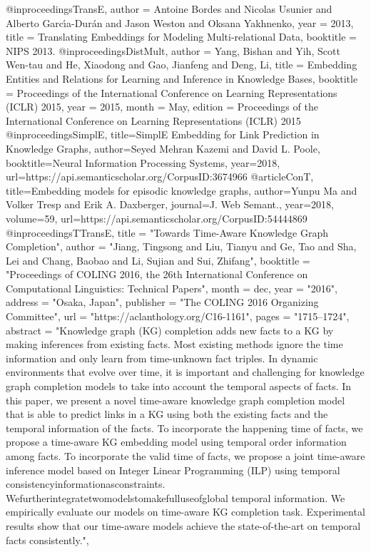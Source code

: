 @inproceedings{TransE,
  author    = {Antoine Bordes and
               Nicolas Usunier and
               Alberto Garc{\'{\i}}a{-}Dur{\'{a}}n and
               Jason Weston and
               Oksana Yakhnenko},
  year      = {2013},
  title     = {Translating Embeddings for Modeling Multi-relational Data},
  booktitle = {NIPS 2013.}
}
@inproceedings{DistMult,
  author    = {Yang, Bishan and Yih, Scott Wen-tau and He, Xiaodong and Gao, Jianfeng and Deng, Li},
  title     = {Embedding Entities and Relations for Learning and Inference in Knowledge Bases},
  booktitle = {Proceedings of the International Conference on Learning Representations (ICLR) 2015},
  year      = {2015},
  month     = {May},
  edition   = {Proceedings of the International Conference on Learning Representations (ICLR) 2015}
}
@inproceedings{SimplE,
  title={SimplE Embedding for Link Prediction in Knowledge Graphs},
  author={Seyed Mehran Kazemi and David L. Poole},
  booktitle={Neural Information Processing Systems},
  year={2018},
  url={https://api.semanticscholar.org/CorpusID:3674966}
}
@article{ConT,
  title={Embedding models for episodic knowledge graphs},
  author={Yunpu Ma and Volker Tresp and Erik A. Daxberger},
  journal={J. Web Semant.},
  year={2018},
  volume={59},
  url={https://api.semanticscholar.org/CorpusID:54444869}
}
@inproceedings{TTransE,
    title = "Towards Time-Aware Knowledge Graph Completion",
    author = "Jiang, Tingsong  and
      Liu, Tianyu  and
      Ge, Tao  and
      Sha, Lei  and
      Chang, Baobao  and
      Li, Sujian  and
      Sui, Zhifang",
    booktitle = "Proceedings of {COLING} 2016, the 26th International Conference on Computational Linguistics: Technical Papers",
    month = dec,
    year = "2016",
    address = "Osaka, Japan",
    publisher = "The COLING 2016 Organizing Committee",
    url = "https://aclanthology.org/C16-1161",
    pages = "1715--1724",
    abstract = "Knowledge graph (KG) completion adds new facts to a KG by making inferences from existing facts. Most existing methods ignore the time information and only learn from time-unknown fact triples. In dynamic environments that evolve over time, it is important and challenging for knowledge graph completion models to take into account the temporal aspects of facts. In this paper, we present a novel time-aware knowledge graph completion model that is able to predict links in a KG using both the existing facts and the temporal information of the facts. To incorporate the happening time of facts, we propose a time-aware KG embedding model using temporal order information among facts. To incorporate the valid time of facts, we propose a joint time-aware inference model based on Integer Linear Programming (ILP) using temporal consistencyinformationasconstraints. Wefurtherintegratetwomodelstomakefulluseofglobal temporal information. We empirically evaluate our models on time-aware KG completion task. Experimental results show that our time-aware models achieve the state-of-the-art on temporal facts consistently.",
}
